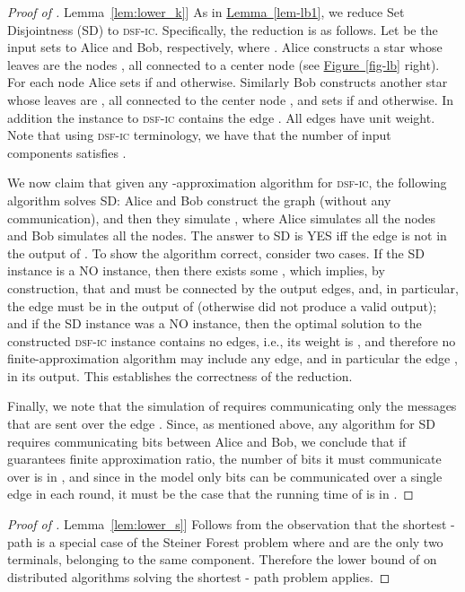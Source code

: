 \documentclass[letterpaper,11pt]{article}
\newcommand{\namedref}[2]{\hyperref[#2]{#1~\ref*{#2}}}
\newcommand{\figureref}[1]{\namedref{Figure}{#1}}
\newcommand{\lemmaref}[1]{\namedref{Lemma}{#1}}
\newcommand{\sfic}{\textsc{dsf-ic}\xspace}
\begin{document}
\begin{proof}[Proof of \lemmaref{lem:lower_k}]
As in \lemmaref{lem-lb1}, we reduce Set Disjointness (SD) to \sfic.
Specifically, 
the reduction is as follows.
Let  be the input sets
to Alice and Bob, respectively, where .
Alice constructs a star whose leaves are the nodes
, all connected to a center node  (see
\figureref{fig-lb} right).  
 For each node  Alice sets  if  and
 otherwise. Similarly Bob
constructs another star whose leaves are , all
connected to the center node , 
and sets  if  and 
otherwise. In addition the instance to \sfic contains the edge
. All edges have unit weight.
Note that using \sfic terminology, we have that the number of input
components satisfies .


We now claim that given any -approximation algorithm  for \sfic,
the following algorithm solves SD: Alice and Bob construct the graph
(without any communication), and then they simulate 
, where Alice simulates all the  nodes and Bob simulates
all the  nodes. The answer to SD is YES iff the
edge  is not in the output of .
To show the algorithm correct, consider two cases.
If the SD instance is  a NO instance, then there exists some , which implies, by construction, that  and  must be
connected by the output edges, and, in particular, the edge   must 
be in the output of  (otherwise  did not produce a
valid output); and if the SD
instance was   a 
NO instance, then the optimal solution to the constructed \sfic instance
contains no edges, i.e., its weight is , and therefore no
finite-approximation 
algorithm may include any edge, and in particular the edge , in its output. This
establishes the correctness of the reduction. 

Finally, we note that 
the simulation of  requires communicating only the messages
that are sent over the edge . Since, as mentioned above, any
algorithm for SD 
requires communicating  bits between Alice and Bob, we conclude that if 
guarantees finite approximation ratio, the number of bits  it must
communicate over  is in , and
since in the 
 model only  bits can be communicated over
a single edge in each round,
it must be the case that the running time of  is in
.
\end{proof}


\begin{proof}[Proof of \lemmaref{lem:lower_s}]
Follows from the observation that the shortest - path is a
special case of the Steiner Forest problem where  and  are the
only two terminals, belonging to the same component. Therefore the
lower bound of 
\cite{DHKNPPW-11} on distributed algorithms solving the shortest -
path problem applies.
\end{proof}
\end{document}

